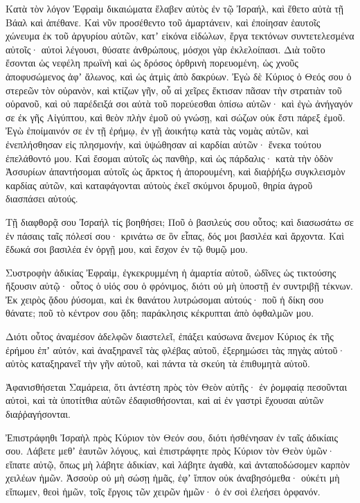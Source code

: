 \begin{spacing}{1.1}
\begin{multicols}{2}
Κατὰ τὸν λόγον Ἐφραὶμ δικαιώματα ἔλαβεν αὐτὸς ἐν τῷ Ἰσραήλ, καὶ ἔθετο αὐτὰ τῇ Βάαλ καὶ ἀπέθανε.
Καὶ νῦν προσέθεντο τοῦ ἁμαρτάνειν, καὶ ἐποίησαν ἑαυτοῖς χώνευμα ἐκ τοῦ ἀργυρίου αὐτῶν, κατʼ εἰκόνα εἰδώλων, ἔργα τεκτόνων συντετελεσμένα αὐτοῖς· αὐτοὶ λέγουσι, θύσατε ἀνθρώπους, μόσχοι γὰρ ἐκλελοίπασι.
Διὰ τοῦτο ἔσονται ὡς νεφέλη πρωϊνὴ καὶ ὡς δρόσος ὀρθρινὴ πορευομένη, ὡς χνοῦς ἀποφυσώμενος ἀφʼ ἅλωνος, καὶ ὡς ἀτμὶς ἀπὸ δακρύων.
Ἐγὼ δὲ Κύριος ὁ Θεός σου ὁ στερεῶν τὸν οὐρανὸν, καὶ κτίζων γῆν, οὗ αἱ χεῖρες ἔκτισαν πᾶσαν τὴν στρατιὰν τοῦ οὐρανοῦ, καὶ οὐ παρέδειξά σοι αὐτὰ τοῦ πορεύεσθαι ὀπίσω αὐτῶν· καὶ ἐγὼ ἀνήγαγόν σε ἐκ γῆς Αἰγύπτου, καὶ θεὸν πλὴν ἐμοῦ οὐ γνώσῃ, καὶ σώζων οὐκ ἔστι πάρεξ ἐμοῦ.
Ἐγὼ ἐποίμαινόν σε ἐν τῇ ἐρήμῳ, ἐν γῇ ἀοικήτῳ
κατὰ τὰς νομὰς αὐτῶν, καὶ ἐνεπλήσθησαν εἰς πλησμονήν, καὶ ὑψώθησαν αἱ καρδίαι αὐτῶν· ἕνεκα τούτου ἐπελάθοντό μου.
Καὶ ἔσομαι αὐτοῖς ὡς πανθὴρ, καὶ ὡς πάρδαλις· κατὰ τὴν ὁδὸν Ἀσσυρίων
ἀπαντήσομαι αὐτοῖς ὡς ἄρκτος ἡ ἀπορουμένη, καὶ διαῤῥήξω συγκλεισμὸν καρδίας αὐτῶν, καὶ καταφάγονται αὐτοὺς ἐκεῖ σκύμνοι δρυμοῦ, θηρία ἀγροῦ διασπάσει αὐτούς.

Τῇ διαφθορᾷ σου Ἰσραήλ τίς βοηθήσει;
Ποῦ ὁ βασιλεύς σου οὗτος; καὶ διασωσάτω σε ἐν πάσαις ταῖς πόλεσί σου· κρινάτω σε ὃν εἶπας, δός μοι βασιλέα καὶ ἄρχοντα.
Καὶ ἔδωκά σοι βασιλέα ἐν ὀργῇ μου, καὶ ἔσχον ἐν τῷ θυμῷ μου.

Συστροφὴν ἀδικίας Ἐφραὶμ, ἐγκεκρυμμένη ἡ ἁμαρτία αὐτοῦ,
ὠδῖνες ὡς τικτούσης ἥξουσιν αὐτῷ· οὗτος ὁ υἱός σου ὁ φρόνιμος, διότι οὐ μὴ ὑποστῇ ἐν συντριβῇ τέκνων.
Ἐκ χειρὸς ᾅδου ῥύσομαι, καὶ ἐκ θανάτου λυτρώσομαι αὐτούς· ποῦ ἡ δίκη σου θάνατε; ποῦ τὸ κέντρον σου ᾅδη; παράκλησις κέκρυπται ἀπὸ ὀφθαλμῶν μου.

Διότι οὗτος ἀναμέσον ἀδελφῶν διαστελεῖ, ἐπάξει καύσωνα ἄνεμον Κύριος ἐκ τῆς ἐρήμου ἐπʼ αὐτόν, καὶ ἀναξηρανεῖ τὰς φλέβας αὐτοῦ, ἐξερημώσει τὰς πηγὰς αὐτοῦ· αὐτὸς καταξηρανεῖ τὴν γῆν αὐτοῦ, καὶ πάντα τὰ σκεύη τὰ ἐπιθυμητὰ αὐτοῦ.

Ἀφανισθήσεται Σαμάρεια, ὅτι ἀντέστη πρὸς τὸν Θεὸν αὐτῆς· ἐν ῥομφαίᾳ πεσοῦνται αὐτοὶ, καὶ τὰ ὑποτίτθια αὐτῶν ἐδαφισθήσονται, καὶ αἱ ἐν γαστρὶ ἔχουσαι αὐτῶν διαῤῥαγήσονται.

Ἐπιστράφηθι Ἰσραὴλ πρὸς Κύριον τὸν Θεόν σου, διότι ἠσθένησαν ἐν ταῖς ἀδικίαις σου.
Λάβετε μεθʼ ἑαυτῶν λόγους, καὶ ἐπιστράφητε πρὸς Κύριον τὸν Θεὸν ὑμῶν· εἴπατε αὐτῷ, ὅπως μὴ λάβητε ἀδικίαν, καὶ λάβητε ἀγαθὰ, καὶ ἀνταποδώσομεν καρπὸν χειλέων ἡμῶν.
Ἀσσοὺρ οὐ μὴ σώσῃ ἡμᾶς, ἐφʼ ἵππον οὐκ ἀναβησόμεθα· οὐκέτι μὴ εἴπωμεν, θεοὶ ἡμῶν, τοῖς ἔργοις τῶν χειρῶν ἡμῶν· ὁ ἐν σοὶ ἐλεήσει ὀρφανόν.


\end{multicols}
\end{spacing}
